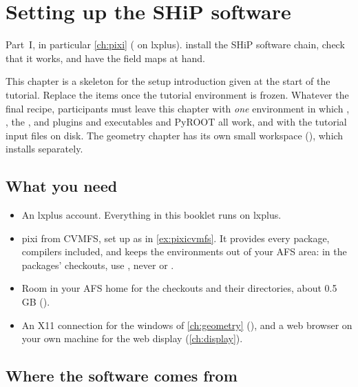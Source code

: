\chapter{Setting up the SHiP software}
\label{ch:setup}

{Part~I, in particular \cref{ch:pixi} ( on lxplus).}
{install the SHiP software chain, check that it works, and have the field maps at hand.}

\begin{organisernote}
This chapter is a skeleton for the setup introduction given at the start of
the tutorial. Replace the \tbd{} items once the tutorial environment is
frozen. Whatever the final recipe, participants must leave this chapter with
\emph{one} environment in which , , the ,
 and  plugins and executables and PyROOT all
work, and with the tutorial input files on disk. The geometry chapter has its
own small workspace (), which installs separately.
\end{organisernote}

\section{What you need}

\begin{itemize}
  \item An lxplus account. Everything in this booklet runs on lxplus.
  \item pixi from CVMFS, set up as in \cref{ex:pixicvmfs}. It provides every
        package, compilers included, and keeps the environments out of your
        AFS area: in the packages' checkouts, use , never
         or .
  \item Room in your AFS home for the checkouts and their 
        directories, about 0.5\,GB ().
  \item An X11 connection for the windows of \cref{ch:geometry}
        (), and a web browser on your own machine for
        the  web display (\cref{ch:display}).
\end{itemize}

\section{Where the software comes from}

